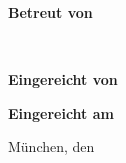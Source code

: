 \renewcommand{\baselinestretch}{1.47}
\normalsize\selectfont
\vspace*{17.1mm}
\textbf{Betreut von}\tab
\begin{minipage}[t]{\textwidth-\CurrentLineWidth}
\BetreutVonPerson\\
\BetreutVonLehrstuhl\strut
\end{minipage}

\vspace*{4.3mm}
\textbf{Eingereicht von}\tab
\begin{minipage}[t]{\textwidth-\CurrentLineWidth}
\EingereichtVon
\end{minipage}

\vspace*{-1mm}
\textbf{Eingereicht am}\tab 
\begin{minipage}[t]{\textwidth-\CurrentLineWidth}
München, den \Datum\strut
\end{minipage}

\newpage

%
%
%

%

\renewcommand{\SeitenrandOben}{25.8mm}
\renewcommand{\SeitenrandRechts}{21mm}
\renewcommand{\SeitenrandLinks}{40mm}
\renewcommand{\SeitenrandUnten}{24.8mm}

\restoregeometry